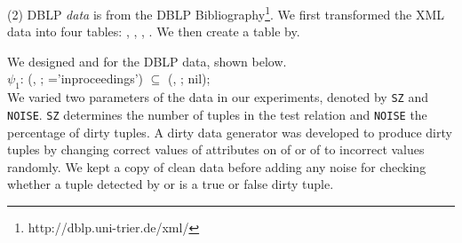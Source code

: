 \vspace{-.5ex} 
\vspace{-.5ex}


(2) DBLP \textit{data} is from the DBLP Bibliography\footnote{http://dblp.uni-trier.de/xml/}. We first transformed the XML data into four tables: , , , . We then create a table  by.

We designed \pCFDs and \pCINDs for the DBLP data, shown below.\\
$\psi _1$: (, ; ='inproceedings') $\subseteq$ (, ; nil);\\

We varied two parameters of the data in our experiments, denoted by \texttt{SZ} and \texttt{NOISE}. \texttt{SZ} determines the number of tuples in the test relation and \texttt{NOISE} the percentage of dirty tuples. A dirty data generator was developed to produce dirty tuples by changing correct values of attributes on \RHS of \pCFDs or \LHS of \pCINDs to incorrect values randomly. We kept a copy of clean data before adding any noise for checking whether a tuple detected by \pCFDs or \pCINDs is a true or false dirty tuple.


